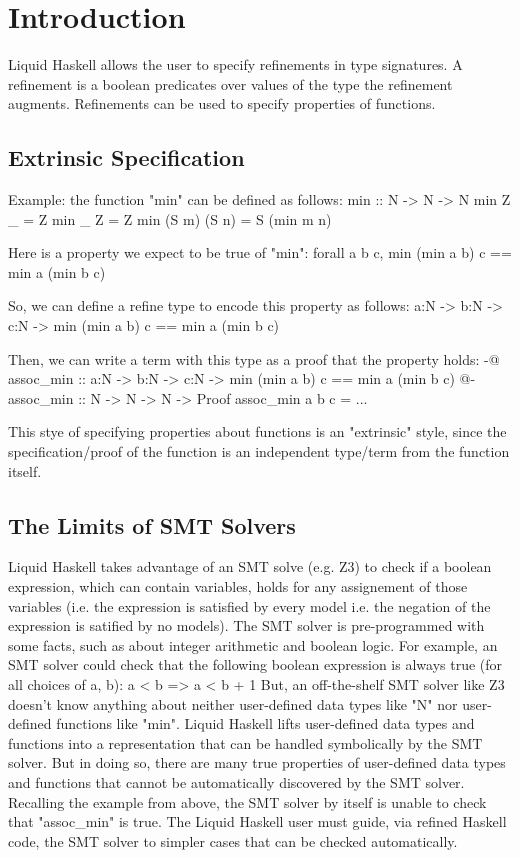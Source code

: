 \section{Introduction}

Liquid Haskell allows the user to specify refinements in type signatures.
A refinement is a boolean predicates over values of the type the refinement augments.
Refinements can be used to specify properties of functions.

\subsection{Extrinsic Specification}

Example: the function "min" can be defined as follows:
  min :: N -> N -> N 
  min Z _ = Z
  min _ Z = Z
  min (S m) (S n) = S (min m n)

Here is a property we expect to be true of "min":
  forall a b c, min (min a b) c == min a (min b c)

So, we can define a refine type to encode this property as follows:
  a:N -> b:N -> c:N -> {min (min a b) c == min a (min b c)}

Then, we can write a term with this type as a proof that the property holds:
  {-@ assoc_min :: a:N -> b:N -> c:N -> {min (min a b) c == min a (min b c)} @-}
  assoc_min :: N -> N -> N -> Proof
  assoc_min a b c = ... 

This stye of specifying properties about functions is an "extrinsic" style, since the specification/proof of the function is an independent type/term from the function itself.

\subsection{The Limits of SMT Solvers}

Liquid Haskell takes advantage of an SMT solve  (e.g. Z3) to check if a boolean expression, which can contain variables, holds for any assignement of those variables (i.e. the expression is satisfied by every model i.e. the negation of the expression is satified by no models).
The SMT solver is pre-programmed with some facts, such as about integer arithmetic and boolean logic.
For example, an SMT solver could check that the following boolean expression is always true (for all choices of a, b):
  a < b => a < b + 1
But, an off-the-shelf SMT solver like Z3 doesn't know anything about neither user-defined data types like "N" nor user-defined functions like "min".
Liquid Haskell lifts user-defined data types and functions into a representation that can be handled symbolically by the SMT solver.
But in doing so, there are many true properties of user-defined data types and functions that cannot be automatically discovered by the SMT solver.
Recalling the example from above, the SMT solver by itself is unable to check that "assoc_min" is true.
The Liquid Haskell user must guide, via refined Haskell code, the SMT solver to simpler cases that can be checked automatically.

